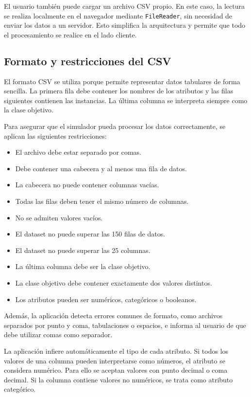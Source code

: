 El usuario también puede cargar un archivo CSV propio. En este caso, la lectura se realiza localmente en el navegador mediante \texttt{FileReader}, sin necesidad de enviar los datos a un servidor. Esto simplifica la arquitectura y permite que todo el procesamiento se realice en el lado cliente.

\subsection{Formato y restricciones del CSV}

El formato CSV se utiliza porque permite representar datos tabulares de forma sencilla. La primera fila debe contener los nombres de los atributos y las filas siguientes contienen las instancias. La última columna se interpreta siempre como la clase objetivo.

Para asegurar que el simulador pueda procesar los datos correctamente, se aplican las siguientes restricciones:

\begin{itemize}
    \item El archivo debe estar separado por comas.
    \item Debe contener una cabecera y al menos una fila de datos.
    \item La cabecera no puede contener columnas vacías.
    \item Todas las filas deben tener el mismo número de columnas.
    \item No se admiten valores vacíos.
    \item El dataset no puede superar las 150 filas de datos.
    \item El dataset no puede superar las 25 columnas.
    \item La última columna debe ser la clase objetivo.
    \item La clase objetivo debe contener exactamente dos valores distintos.
    \item Los atributos pueden ser numéricos, categóricos o booleanos.
\end{itemize}

Además, la aplicación detecta errores comunes de formato, como archivos separados por punto y coma, tabulaciones o espacios, e informa al usuario de que debe utilizar comas como separador.

La aplicación infiere automáticamente el tipo de cada atributo. Si todos los valores de una columna pueden interpretarse como números, el atributo se considera numérico. Para ello se aceptan valores con punto decimal o coma decimal. Si la columna contiene valores no numéricos, se trata como atributo categórico.

